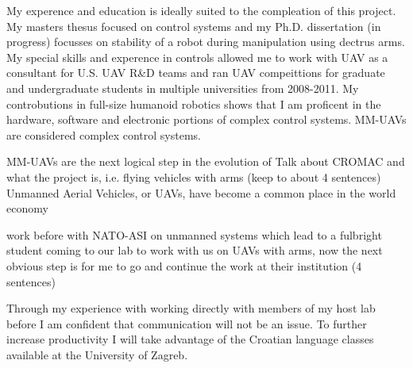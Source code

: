 \documentclass[12pt]{article}
\begin{document}
My experence and education is ideally suited to the compleation of this project.  My masters thesus focused on control systems and my Ph.D. dissertation (in progress) focusses on stability of a robot during manipulation using dectrus arms.  My special skills and experence in controls allowed me to work with UAV as a consultant for U.S. UAV R\&D teams and ran UAV compeittions for graduate and undergraduate students in multiple universities from 2008-2011.  My controbutions in full-size humanoid robotics shows that I am proficent in the hardware, software and electronic portions of complex control systems.  MM-UAVs are considered complex control systems.



MM-UAVs are the next logical step in the evolution of 
Talk about CROMAC and what the project is, i.e. flying vehicles with arms (keep to about 4 sentences)
Unmanned Aerial Vehicles, or UAVs, have become a common place in the world economy



work before with NATO-ASI on unmanned systems which lead to a fulbright student coming to our lab 
to work with us on UAVs with arms, now the next obvious step is for me to go and continue the work at 
their institution (4 sentences)

Through my experience with working directly with members of my host lab before I am confident that communication will not be an issue.  To further increase productivity I will take advantage of the Croatian language classes available at the University of Zagreb.
\end{document}
